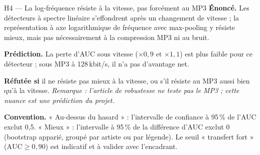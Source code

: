 \documentclass[11pt,a4paper]{article}
\newcommand{\AUC}{\textrm{AUC}}
\begin{document}
\begin{hyp}{H4 --- La log-fréquence résiste à la vitesse, pas forcément au MP3}
\textbf{Énoncé.} Les détecteurs à spectre linéaire s'effondrent après un changement de vitesse ; la représentation à axe logarithmique de fréquence avec max-pooling y résiste mieux, mais pas nécessairement à la compression MP3 ni au bruit.

\textbf{Prédiction.} La perte d'AUC sous vitesse ($\times 0{,}9$ et $\times 1{,}1$) est plus faible pour ce détecteur ; sous MP3 à 128\,kbit/s, il n'a pas d'avantage net.

\textbf{Réfutée si} il ne résiste pas mieux à la vitesse, ou s'il résiste au MP3 aussi bien qu'à la vitesse. \emph{Remarque : l'article de robustesse ne teste pas le MP3 ; cette nuance est une prédiction du projet.}
\end{hyp}

\textbf{Convention.} « Au-dessus du hasard » : l'intervalle de confiance à 95\,\% de l'AUC exclut 0,5. « Mieux » : l'intervalle à 95\,\% de la différence d'AUC exclut 0 (bootstrap apparié, groupé par artiste ou par légende). Le seuil « transfert fort » ($\AUC \geq 0{,}90$) est indicatif et à valider avec l'encadrant.
\end{document}
